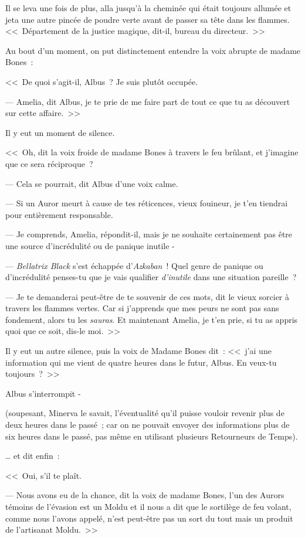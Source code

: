 Il se leva une fois de plus, alla jusqu'à la cheminée qui était toujours allumée et jeta une autre pincée de poudre verte avant de passer sa tête dans les flammes. <<~Département de la justice magique, dit-il, bureau du directeur.~>>

Au bout d'un moment, on put distinctement entendre la voix abrupte de madame Bones~:

<<~De quoi s'agit-il, Albus~? Je suis plutôt occupée.

--- Amelia, dit Albus, je te prie de me faire part de tout ce que tu as découvert sur cette affaire.~>>

Il y eut un moment de silence.

<<~Oh, dit la voix froide de madame Bones à travers le feu brûlant, et j'imagine que ce sera réciproque~?

--- Cela se pourrait, dit Albus d'une voix calme.

--- Si un Auror meurt à cause de tes réticences, vieux fouineur, je t'en tiendrai pour entièrement responsable.

--- Je comprends, Amelia, répondit-il, mais je ne souhaite certainement pas être une source d'incrédulité ou de panique inutile -

--- \emph{Bellatrix Black} s'est échappée d'\emph{Azkaban}~! Quel genre de panique ou d'incrédulité penses-tu que je vais qualifier \emph{d'inutile} dans une situation pareille~?

--- Je te demanderai peut-être de te souvenir de ces mots, dit le vieux sorcier à travers les flammes vertes. Car si j'apprends que mes peurs ne sont pas sans fondement, alors tu les \emph{sauras}. Et maintenant Amelia, je t'en prie, si tu as appris quoi que ce soit, dis-le moi.~>>

Il y eut un autre silence, puis la voix de Madame Bones dit~: <<~j'ai une information qui me vient de quatre heures dans le futur, Albus. En veux-tu toujours~?~>>

Albus s'interrompit -

(soupesant, Minerva le savait, l'éventualité qu'il puisse vouloir revenir plus de deux heures dans le passé~; car on ne pouvait envoyer des informations plus de six heures dans le passé, pas même en utilisant plusieurs Retourneurs de Temps).

… et dit enfin~:

<<~Oui, s'il te plaît.

--- Nous avons eu de la chance, dit la voix de madame Bones, l'un des Aurors témoins de l'évasion est un Moldu et il nous a dit que le sortilège de feu volant, comme nous l'avons appelé, n'est peut-être pas un sort du tout mais un produit de l'artisanat Moldu.~>>

